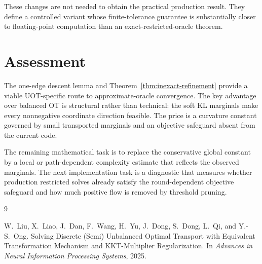 \documentclass[11pt]{article}
\begin{document}
These changes are not needed to obtain the practical production result.
They define a controlled variant whose finite-tolerance guarantee is substantially closer to floating-point computation than an exact-restricted-oracle theorem.

\section{Assessment}

The one-edge descent lemma and Theorem~\ref{thm:inexact-refinement} provide a viable UOT-specific route to approximate-oracle convergence.
The key advantage over balanced OT is structural rather than technical: the soft KL marginals make every nonnegative coordinate direction feasible.
The price is a curvature constant governed by small transported marginals and an objective safeguard absent from the current code.

The remaining mathematical task is to replace the conservative global constant by a local or path-dependent complexity estimate that reflects the observed marginals.
The next implementation task is a diagnostic that measures whether production restricted solves already satisfy the round-dependent objective safeguard and how much positive flow is removed by threshold pruning.

\begin{thebibliography}{9}

W.~Liu, X.~Liao, J.~Dan, F.~Wang, H.~Yu, J.~Dong, S.~Dong, L.~Qi, and Y.-S.~Ong.
\newblock Solving Discrete (Semi) Unbalanced Optimal Transport with Equivalent Transformation Mechanism and KKT-Multiplier Regularization.
\newblock In \emph{Advances in Neural Information Processing Systems}, 2025.

\end{thebibliography}
\end{document}
